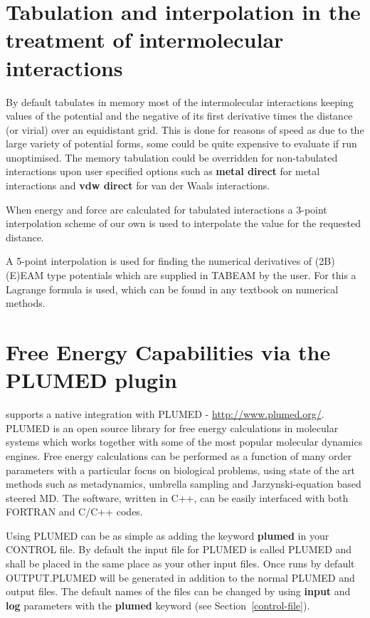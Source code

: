 \section{Tabulation and interpolation in the treatment of intermolecular interactions}

By default \D tabulates in memory most of the intermolecular interactions
keeping values of the potential and the negative of its first derivative
times the distance (or virial) over an equidistant grid.  This is done
for reasons of speed as due to the large variety of potential forms, some
could be quite expensive to evaluate if run unoptimised.  The memory
tabulation could be overridden for non-tabulated interactions upon user
specified options such as {\bf metal direct} for metal interactions and
{\bf vdw direct} for van der Waals interactions.

When energy and force are calculated for tabulated interactions a 3-point
interpolation scheme of our own is used to interpolate the value for the
requested distance.

A 5-point interpolation is used for finding the numerical derivatives of
(2B)(E)EAM type potentials which are supplied in TABEAM by the user.  For
this a Lagrange formula is used, which can be found in any textbook on
numerical methods.

\section{Free Energy Capabilities via the PLUMED plugin}
\label{plumed}

\D supports a native integration with PLUMED - \href{http://www.plumed.org/}{http://www.plumed.org/}.
PLUMED is an open source library for free energy calculations in
molecular systems which works together with some of the most popular
molecular dynamics engines.  Free energy calculations can be performed
as a function of many order parameters with a particular focus on
biological problems, using state of the art methods such as metadynamics,
umbrella sampling \cite{torrie-77a,kastner-11a} and Jarzynski-equation
based steered MD.  The software, written in C++, can be easily interfaced
with both FORTRAN and C/C++ codes.

Using PLUMED can be as simple as adding the keyword {\bf plumed} in
your CONTROL file. By default the input file for PLUMED is called PLUMED
and shall be placed in the same place as your other \D input files. Once
\D runs by default OUTPUT.PLUMED will be generated in addition to the
normal PLUMED and \D output files.  The default names of the files can
be changed by using {\bf input} and {\bf log} parameters with the
{\bf plumed} keyword (see Section~\ref{control-file}).

